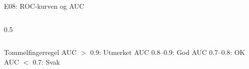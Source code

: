 \documentclass[aspectratio=169, 10pt]{beamer}
\begin{document}
\begin{frame}{E08: ROC-kurven og AUC}
\begin{columns}
\begin{column}{0.5\textwidth}
\begin{center}
            \end{center}
        \end{column}
    \end{columns}
    
    \vspace{3mm}
    
    \begin{block}{Tommelfingerregel}
        AUC $>$ 0.9: Utmerket \quad AUC 0.8--0.9: God \quad AUC 0.7--0.8: OK \quad AUC $<$ 0.7: Svak
    \end{block}
    
\end{frame}
\end{document}
